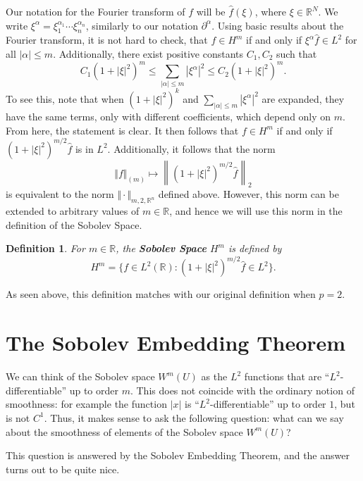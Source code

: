 \documentclass[12pt,letterpaper,reqno]{article}
\theoremstyle{plain}                              %
\newtheorem{defn}[thm]{Definition}
\theoremstyle{definition}                         %
\theoremstyle{remark}                             %
\numberwithin{equation}{section}
\newcommand{\R}{\mathbb{R}}                     %
\begin{document}
Our notation for the Fourier transform of $f$ will be $\widehat{f}(\xi)$, where $\xi\in \R^N$. We write $\xi^\alpha = \xi_1^{\alpha_1}\cdots \xi_n^{\alpha_n}$, similarly to our notation $\partial^\alpha$. Using basic results about the Fourier transform, it is not hard to check, that $f\in H^m$ if and only if $\xi^\alpha \widehat{f}\in L^2$ for all $|\alpha|\le m$. Additionally, there exist positive constants $C_1,C_2$ such that
\[C_1(1+|\xi|^2)^m \le \sum_{|\alpha|\le m}|\xi^\alpha|^2 \le C_2 (1+ |\xi|^2)^m.\]
To see this, note that when $(1+|\xi|^2)^k$ and $ \sum_{|\alpha|\le m}|\xi^\alpha|^2$ are expanded, they have the same terms, only with different coefficients, which depend only on $m$. From here, the statement is clear.
It then follows that $f\in H^m$ if and only if $(1+|\xi|^2)^{m/2}\widehat{f}$ is in $L^2$. Additionally, it follows that the norm
\[\Vert f\Vert_{(m)}\mapsto \left\lVert (1+|\xi|^2)^{m/2}\widehat{f}\right\rVert_2\]
is equivalent to the norm $\Vert\cdot \Vert_{m,2, \R^n}$ defined above. However, this norm can be extended to arbitrary values of $m\in \R$, and hence we will use this norm in the definition of the Sobolev Space.

\begin{defn}
    For $m\in \R$, the \textbf{Sobolev Space} $H^m$ is defined by
    \[H^m = \{f\in L^2 (\R): (1+ |\xi|^2)^{m/2}\widehat{f}\in L^2\}.\]
\end{defn}
As seen above, this definition matches with our original definition when $p=2$. 

\section{The Sobolev Embedding Theorem}
We can think of the Sobolev space $W^m(U)$ as the $L^2$ functions that are ``$L^2$-differentiable'' up to order $m$. This does not coincide with the ordinary notion of smoothness: for example the function $|x|$ is ``$L^2$-differentiable'' up to order $1$, but is not $C^1$. Thus, it makes sense to ask the following question: what can we say about the smoothness of elements of the Sobolev space $W^m(U)$?

This question is answered by the Sobolev Embedding Theorem, and the answer turns out to be quite nice.
\end{document}
